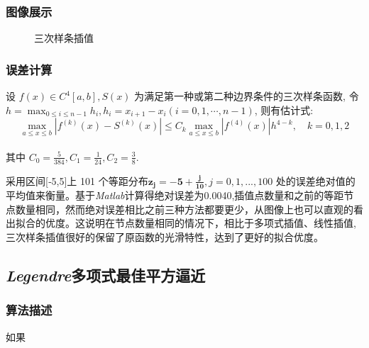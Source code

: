 \documentclass{ctexart}%
\begin{document}
\subsubsection{图像展示}
\begin{figure}[H]
    \centering
    
    \caption{三次样条插值}
    \label{spline}
\end{figure}

\subsubsection{误差计算}
设 $f(x) \in C^{4}[a, b], S(x)$ 为满足第一种或第二种边界条件的三次样条函数, 令 $h=\max _{0 \leqslant i \leqslant n-1} h_{i}, h_{i}=x_{i+1}-x_{i}(i=0,1, \cdots, n-1)$, 则有估计式: 
$$\max _{a \leqslant x \leqslant b}\left|f^{(k)}(x)-S^{(k)}(x)\right| \leqslant C_{k} \max _{a \leqslant x \leqslant b}\left|f^{(4)}(x)\right| h^{4-k}, \quad k=0,1,2$$
\\其中 $C_{0}=\frac{5}{384}, C_{1}=\frac{1}{24}, C_{2}=\frac{3}{8}$.

采用区间[‐5,5]上 101 个等距分布$\mathbf{z_j=-5+\frac{j}{10}},j=0,1,...,100$
处的误差绝对值的平均值来衡量。基于\textit{Matlab}计算得绝对误差为0.0040,插值点数量和之前的等距节点数量相同，然而绝对误差相比之前三种方法都要更少，从图像上也可以直观的看出拟合的优度。这说明在节点数量相同的情况下，相比于多项式插值、线性插值,三次样条插值很好的保留了原函数的光滑特性，达到了更好的拟合优度。




\subsection{\textit{Legendre}多项式最佳平方逼近}
\subsubsection{算法描述}
如果
\end{document}

